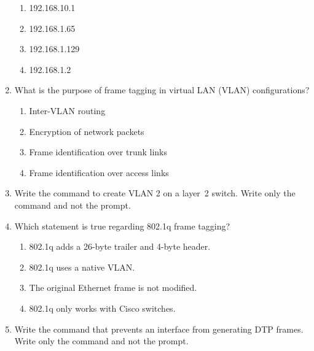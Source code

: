 \begin{enumerate}
  \begin{figure}
  \centering
  \caption{}
  \end{figure}

  \begin{enumerate}
  \tightlist
  \item
    192.168.10.1
  \item
    192.168.1.65
  \item
    192.168.1.129
  \item
    192.168.1.2
  \end{enumerate}
\item
   What is the
  purpose of frame tagging in virtual LAN (VLAN) configurations?

  \begin{enumerate}
  \tightlist
  \item
    Inter-VLAN routing
  \item
    Encryption of network packets
  \item
    Frame identification over trunk links
  \item
    Frame identification over access links
  \end{enumerate}
\item
  Write the command to create VLAN 2 on a layer~2 switch. Write only the
  command and not the prompt.
\item
  Which statement is true regarding 802.1q frame tagging?

  \begin{enumerate}
  \tightlist
  \item
    802.1q adds a 26-byte trailer and 4-byte header.
  \item
    802.1q uses a native VLAN.
  \item
    The original Ethernet frame is not modified.
  \item
    802.1q only works with Cisco switches.
  \end{enumerate}
\item
  Write the command that prevents an interface from generating DTP
  frames. Write only the command and not the prompt.
\end{enumerate}



